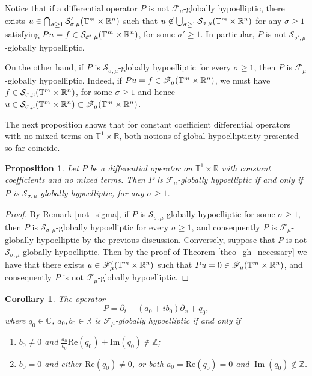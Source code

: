 \documentclass[11pt,reqno]{amsart}
\numberwithin{equation}{section}
\newtheorem{corollary}[theorem]{Corollary}
\newtheorem{prop}[theorem]{Proposition}
\theoremstyle{definition}
\theoremstyle{definition}
\newcommand{\T}{\mathbb{T}}
\newcommand{\G}{\mathnormal{\mathbb{T}^{m}\times\mathbb{R}^n}}
\newcommand{\R}{\mathbb{R}}
\newcommand{\Z}{\mathbb{Z}}
\newcommand{\Real}{\mathrm{Re}}
\newcommand{\Imag}{\mathrm{Im}}
\renewcommand{\S}{\mathcal{S}_{\sigma,\mu}(\G)}
\renewcommand{\SS}{\mathcal{S}'_{\sigma,\mu}(\G)}
\begin{document}
Notice that if a differential operator $P$ is not $\mathscr{F}_\mu$-globally hypoelliptic, there exists $u\in \bigcap_{\sigma\geq 1} \SS$ such that $u\not\in \bigcup_{\sigma\geq 1}\S$ for any $\sigma\geq1$ satisfying $Pu=f\in\mathcal{S}_{\sigma',\mu}(\G)$, for some $\sigma'\geq 1$. In particular, $P$ is not $\mathcal{S}_{\sigma',\mu}$-globally hypoelliptic.

On the other hand, if $P$ is  $\mathcal{S}_{\sigma,\mu}$-globally hypoelliptic for every $\sigma\geq 1$, then $P$ is $\mathscr{F}_\mu$-globally hypoelliptic. Indeed, if $Pu=f\in \mathscr{F}_\mu(\G)$, we must have $f\in \S$, for some $\sigma\geq 1$ and hence $u\in \S\subset \mathscr{F}_\mu(\G)$.

The next proposition shows that for constant coefficient differential operators with no mixed terms on $\T^1\times \R$, both notions of global hypoellipticity presented so far coincide.

\begin{prop}\label{prop_equivalence_cte_coef}    
Let $P$ be a differential operator on $\T^1\times\R$ with constant coefficients and no mixed terms. Then $P$ is  $\mathscr{F}_\mu$-globally hypoelliptic if and only if $P$ is $\mathcal{S}_{\sigma,\mu}$-globally hypoelliptic, for any $\sigma\geq 1$. 
\end{prop}
\begin{proof}
By Remark \ref{not_sigma}, if $P$ is $\mathcal{S}_{\sigma,\mu}$-globally hypoelliptic for some $\sigma\geq 1$, then $P$ is $\mathcal{S}_{\sigma,\mu}$-globally hypoelliptic for every $\sigma\geq 1$, and consequently $P$ is $\mathscr{F}_\mu$-globally hypoelliptic by the previous discussion. Conversely, suppose that $P$ is not $\mathcal{S}_{\sigma,\mu}$-globally hypoelliptic. Then by the proof of Theorem \ref{theo_gh_necessary} we have that there exists $u\in \mathscr{F}'_\mu(\G)$ such that $Pu=0\in\mathscr{F}_\mu(\G)$, and consequently $P$ is not $\mathscr{F}_\mu$-globally hypoelliptic.
\end{proof}

\begin{corollary}\label{coro-tube-cte}
    The operator
    \[P=\partial_t + (a_0+ib_0)\partial_x + q_0,\]
    where $q_0\in\mathbb{C}$, $a_0,b_0\in\R$ is $\mathscr{F}_\mu$-globally hypoelliptic if and only if
    \begin{enumerate}
        \item[(i)] $b_0\neq 0$ and $\frac{a_0}{b_0}\Real(q_0)+\Imag(q_0)\notin\mathbb{Z}$;
        \item[(ii)] $b_0=0$ and either $\Real(q_0)\neq 0$, or both $a_0=\Real(q_0)=0$ and $\operatorname{Im}(q_0)\notin\Z$.
    \end{enumerate}
\end{corollary}
\end{document}
